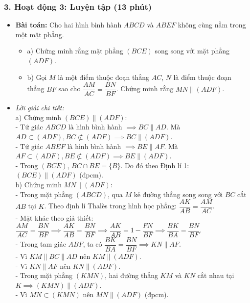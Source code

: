 \documentclass[12pt, a4paper]{article}
\begin{document}
\subsubsection*{3. Hoạt động 3: Luyện tập (13 phút)}
\begin{itemize}
    \item \textbf{Bài toán:} Cho hai hình bình hành $ABCD$ và $ABEF$ không cùng nằm trong một mặt phẳng.
    \begin{itemize}
        \item a) Chứng minh rằng mặt phẳng $(BCE)$ song song với mặt phẳng $(ADF)$.
        \item b) Gọi $M$ là một điểm thuộc đoạn thẳng $AC$, $N$ là điểm thuộc đoạn thẳng $BF$ sao cho $\dfrac{AM}{AC} = \dfrac{BN}{BF}$. Chứng minh rằng $MN \parallel (ADF)$.
    \end{itemize}
    \item \textit{Lời giải chi tiết:}\\
    a) Chứng minh $(BCE) \parallel (ADF)$:\\
    - Tứ giác $ABCD$ là hình bình hành $\implies BC \parallel AD$. Mà $AD \subset (ADF), BC \not\subset (ADF) \implies BC \parallel (ADF)$.\\
    - Tứ giác $ABEF$ là hình bình hành $\implies BE \parallel AF$. Mà $AF \subset (ADF), BE \not\subset (ADF) \implies BE \parallel (ADF)$.\\
    - Trong $(BCE)$, $BC \cap BE = \{B\}$. Do đó theo Định lí 1: $(BCE) \parallel (ADF)$ (đpcm).\\
    b) Chứng minh $MN \parallel (ADF)$:\\
    - Trong mặt phẳng $(ABCD)$, qua $M$ kẻ đường thẳng song song với $BC$ cắt $AB$ tại $K$. Theo định lí Thalès trong hình học phẳng: $\dfrac{AK}{AB} = \dfrac{AM}{AC}$.\\
    - Mặt khác theo giả thiết: $\dfrac{AM}{AC} = \dfrac{BN}{BF} \implies \dfrac{AK}{AB} = \dfrac{BN}{BF} \implies \dfrac{AK}{AB} = 1 - \dfrac{FN}{BF} \implies \dfrac{BK}{BA} = \dfrac{BN}{BF}$.\\
    - Trong tam giác $ABF$, ta có $\dfrac{BK}{BA} = \dfrac{BN}{BF} \implies KN \parallel AF$.\\
    - Vì $KM \parallel BC \parallel AD$ nên $KM \parallel (ADF)$.\\
    - Vì $KN \parallel AF$ nên $KN \parallel (ADF)$.\\
    - Trong mặt phẳng $(KMN)$, hai đường thẳng $KM$ và $KN$ cắt nhau tại $K \implies (KMN) \parallel (ADF)$.\\
    - Vì $MN \subset (KMN)$ nên $MN \parallel (ADF)$ (đpcm).
\end{itemize}
\end{document}
